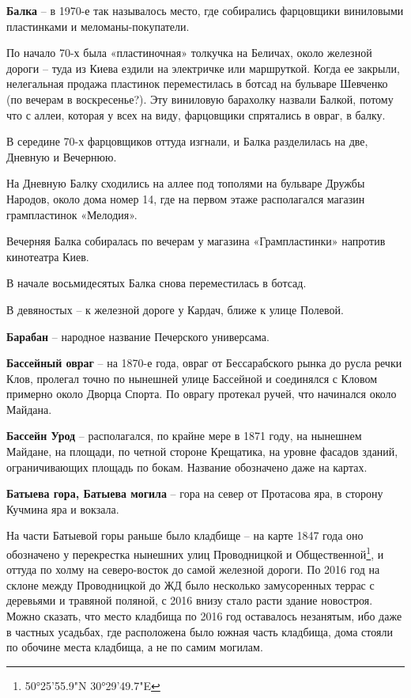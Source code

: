 \medskip


\textbf{Балка} – в 1970-е так называлось место, где собирались фарцовщики виниловыми пластинками и меломаны-покупатели. 

По начало 70-х была «пластиночная» толкучка на Беличах, около железной дороги – туда из Киева ездили на электричке или маршруткой. Когда ее закрыли, нелегальная продажа пластинок переместилась в ботсад на бульваре Шевченко (по вечерам в воскресенье?). Эту виниловую барахолку назвали Балкой, потому что с аллеи, которая у всех на виду, фарцовщики спрятались в овраг, в балку.

В середине 70-х фарцовщиков оттуда изгнали, и Балка разделилась на две, Дневную и Вечернюю.

На Дневную Балку сходились на аллее под тополями на бульваре Дружбы Народов, около дома номер 14, где на первом этаже располагался магазин грампластинок «Мелодия».

Вечерняя Балка собиралась по вечерам у магазина «Грампластинки» напротив кинотеатра Киев.

В начале восьмидесятых Балка снова переместилась в ботсад. 

В девяностых – к железной дороге у Кардач, ближе к улице Полевой.\\


\medskip

\textbf{Барабан} – народное название Печерского универсама.\\

\medskip

\textbf{Бассейный овраг} – на 1870-е года, овраг от Бессарабского рынка до русла речки Клов, пролегал точно по нынешней улице Бассейной и соединялся с Кловом примерно около Дворца Спорта. По оврагу протекал ручей, что начинался около Майдана.\\

\medskip

\textbf{Бассейн Урод} – располагался, по крайне мере в 1871 году, на нынешнем Майдане, на площади, по четной стороне Крещатика, на уровне фасадов зданий, ограничивающих площадь по бокам. Название обозначено даже на картах.\\


\medskip


\textbf{Батыева гора, Батыева могила} –  гора на север от Протасова яра, в сторону Кучмина яра и вокзала.

На части Батыевой горы раньше было кладбище – на карте 1847 года оно обозначено у перекрестка нынешних улиц Проводницкой и Общественной\footnote{50°25'55.9"N 30°29'49.7"E}, и оттуда по холму на северо-восток до самой железной дороги. По 2016 год на склоне между Проводницкой до ЖД было несколько замусоренных террас с деревьями и травяной поляной, с 2016 внизу стало расти здание новостроя. Можно сказать, что место кладбища по 2016 год оставалось незанятым, ибо даже в частных усадьбах, где расположена было южная часть кладбища, дома стояли по обочине места кладбища, а не по самим могилам.\\

